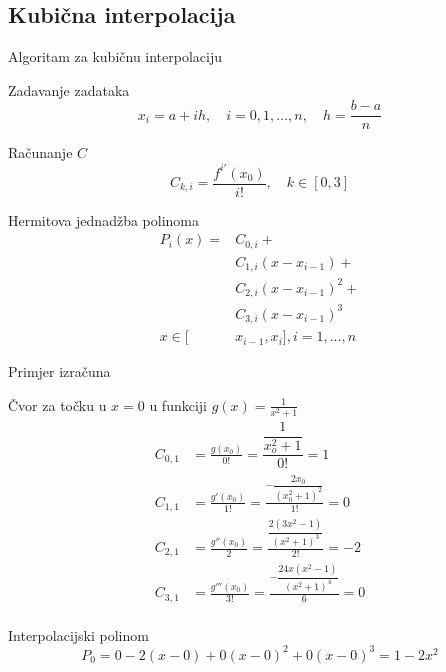 \documentclass[10pt]{beamer}
\begin{document}
\subsection{Kubična interpolacija}
\begin{frame}{Algoritam za kubičnu interpolaciju}

	\begin{exampleblock}{Zadavanje zadataka}
		\begin{equation*}
		x_i=a+ih,\quad i=0,1,\ldots,n,\quad h=\frac{b-a}{n}
		\end{equation*}
	\end{exampleblock}
	\begin{exampleblock}{Računanje $C$}
		\begin{equation*}
		C_{k, i}=\frac{f^{i'}(x_0)}{i!},\quad k\in [0, 3]
		\end{equation*}
		
	\end{exampleblock}
	
	\begin{exampleblock}{Hermitova jednadžba polinoma}
	\begin{align*}
	P_i(x)=&C_{0,i}+\\&C_{1,i}(x-x_{i-1})+\\&C_{2,i}(x-x_{i-1})^2+\\&C_{3,i}(x-x_{i-1})^3 \\
	x\in[&x_{i-1}, x_i], i=1,...,n
	\end{align*}	
	\end{exampleblock}
	
\end{frame}
\begin{frame}{Primjer izračuna}
\begin{exampleblock}{Čvor za točku u $x=0$ u funkciji $g(x)=\frac{1}{x^2+1}$}
	\begin{align*}
	C_{0,1}&=\frac{g(x_0)}{0!}=\dfrac{\dfrac{1}{x_o^2+1}}{0!}= 1\\
	C_{1,1}&=\frac{g'(x_0)}{1!}=\frac{-\dfrac{2x_0}{(x_0^2+1)^2}}{1!}=0\\
	C_{2,1}&=\frac{g''(x_0)}{2}=\frac{\dfrac{2(3x^2-1)}{(x^2+1)^3}
	}{2!}=-2\\
	C_{3,1}&=\frac{g'''(x_0)}{3!}=\frac{-\dfrac{24x\left(x^2-1\right)}{\left(x^2+1\right)^4}}{6}=0\\
	\end{align*}
\end{exampleblock}
\begin{exampleblock}{Interpolacijski polinom}
	\begin{equation*}
	P_0=0-2(x-0)+0(x-0)^2+0(x-0)^3 = 1-2x^2
	\end{equation*}
\end{exampleblock}
\end{frame}
\end{document}
